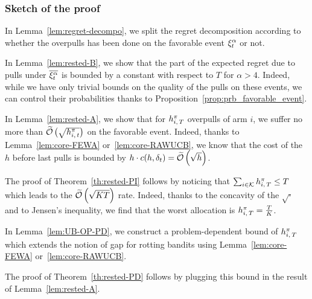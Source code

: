 \subsubsection*{Sketch of the proof}
In Lemma~\ref{lem:regret-decompo}, we split the regret decomposition according to whether the overpulls has been done on the favorable event $\xi^\alpha_t$ or not. 

In Lemma~\ref{lem:rested-B}, we show that the part of the expected regret due to pulls under $\overline{\xi^\alpha_t}$ is bounded by a constant with respect to $T$ for $\alpha > 4$. Indeed, while we have only trivial bounds on the quality of the pulls on these events, we can control their probabilities thanks to Proposition~\ref{prop:prb_favorable_event}.

In Lemma~\ref{lem:rested-A}, we show that for $h_{i,\,T}^\pi$ overpulls of arm $i$, we suffer no more than $\widetilde{\mathcal{O}}\left(\sqrt{h_{i,\,t}^\pi}\right)$ on the favorable event. Indeed, thanks to Lemma~\ref{lem:core-FEWA} or~\ref{lem:core-RAWUCB}, we know that the cost of the $h$ before last pulls is bounded by $h \cdot c(h, \delta_t) = \widetilde{\mathcal{O}}\left(\sqrt{h}\right)$.

The proof of Theorem~\ref{th:rested-PI} follows by noticing that $\sum_{i \in \mathcal{K}} h_{i,\,T}^\pi \leq T$ which leads to the $\widetilde{\mathcal{O}}\left(\sqrt{KT}\right)$ rate. Indeed, thanks to the concavity of the $\sqrt{\cdot}$ and to Jensen's inequality, we find that the worst allocation is $h_{i,\,T}^\pi = \frac{T}{K}$.

In Lemma~\ref{lem:UB-OP-PD}, we construct a problem-dependent bound of $h_{i,\,T}^\pi$ which extends the notion of gap for rotting bandits using Lemma~\ref{lem:core-FEWA} or~\ref{lem:core-RAWUCB}.

The proof of Theorem~\ref{th:rested-PD} follows by plugging this bound in the result of Lemma~\ref{lem:rested-A}.
%

